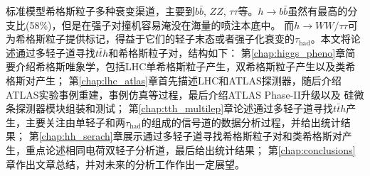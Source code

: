 标准模型希格斯粒子多种衰变渠道，主要到$b\bar{b}$, $ZZ$, $\tau\tau$等。$h\rightarrow b\bar{b}$虽然有最高的分支比(58\%)，但是在强子对撞机容易淹没在海量的喷注本底中。
而$h\rightarrow WW/\tau\tau$可为希格斯粒子提供标记，得益于它们的轻子末态或者强子化衰变的$\tau_{\text{had}}$。本文将论述通过多轻子道寻找$t\bar{t}h$和希格斯粒子对，结构如下：
第\ref{chap:higgs_pheno}章简要介绍希格斯唯象学，包括LHC单希格斯粒子产生，双希格斯粒子产生以及类希格斯对产生；
第\ref{chap:lhc_atlas}章首先描述LHC和ATLAS探测器，随后介绍ATLAS实验事例重建，事例仿真等过程，最后介绍ATLAS Phase-II升级以及
硅微条探测器模块组装和测试；
第\ref{chap:tth_multilep}章论述通过多轻子道寻找$t\bar{t}h$产生，主要关注由单轻子和两$\tau_{\text{had}}$的组成的信号道的数据分析过程，并给出统计结果；
第\ref{chap:hh_serach}章展示通过多轻子道寻找希格斯粒子对和类希格斯对产生，重点论述相同电荷双轻子分析道，最后给出统计结果；
第\ref{chap:conclusions}章作出文章总结，并对未来的分析工作作出一定展望。
